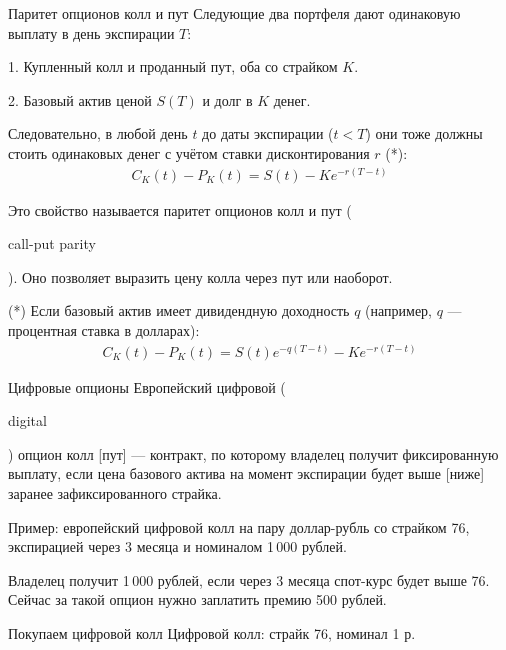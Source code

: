 \documentclass{beamer}
\newcommand{\en}[1]{\begin{otherlanguage}{english}#1\end{otherlanguage}}
\begin{document}
\begin{frame}{Паритет опционов колл и пут}
\justify
Следующие два портфеля дают одинаковую выплату в день экспирации $T$:

1. Купленный колл и проданный пут, оба со страйком $K$.

2. Базовый актив ценой $S(T)$ и долг в $K$ денег.

\justify
Следовательно, в любой день $t$ до даты экспирации ($t<T$) они тоже должны стоить одинаковых денег с учётом ставки дисконтирования $r$ (*):
\begin{align*}
C_K(t) - P_K(t) = S(t) - Ke^{-r(T-t)}
\end{align*}

\justify
Это свойство называется \alert{паритет опционов колл и пут} (\en{call-put parity}). Оно позволяет выразить цену колла через пут или наоборот.

\justify
(*) Если базовый актив имеет дивидендную доходность $q$ (например, $q$ --- процентная ставка в долларах):
\begin{align*}
C_K(t) - P_K(t) = S(t)e^{-q(T-t)} - Ke^{-r(T-t)}
\end{align*}
\end{frame}



\begin{frame}{Цифровые опционы}
\justify
Европейский \alert{цифровой} (\en{digital}) опцион колл [пут] --- контракт, по которому 
владелец получит фиксированную выплату, если цена базового актива на момент экспирации 
будет выше [ниже] заранее зафиксированного страйка.

\justify
Пример: европейский цифровой колл на пару доллар-рубль со страйком 76, экспирацией 
через 3 месяца и номиналом 1\,000 рублей.

\justify
Владелец получит 1\,000 рублей, если через 3 
месяца спот-курс будет выше 76. Сейчас за такой опцион нужно заплатить премию 500 
рублей.
\end{frame}



\begin{frame}{Покупаем цифровой колл}
\justifying
Цифровой колл: страйк 76, номинал 1 р.

\justifying
\centering
\end{frame}
\end{document}
